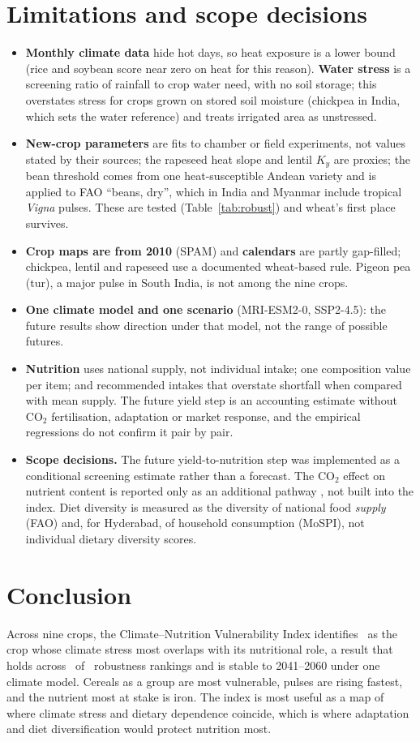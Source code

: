 \section{Limitations and scope decisions}\label{sec:limits}
\begin{itemize}
\item \textbf{Monthly climate data} hide hot days, so heat exposure is a lower bound (rice and soybean
score near zero on heat for this reason). \textbf{Water stress} is a screening ratio of rainfall to crop water
need, with no soil storage; this overstates stress for crops grown on stored soil moisture (chickpea in
India, which sets the water reference) and treats irrigated area as unstressed.
\item \textbf{New-crop parameters} are fits to chamber or field experiments, not values stated by their
sources; the rapeseed heat slope and lentil $K_y$ are proxies; the bean threshold comes from one
heat-susceptible Andean variety and is applied to FAO ``beans, dry'', which in India and Myanmar include
tropical \emph{Vigna} pulses. These are tested (Table~\ref{tab:robust}) and wheat's first place survives.
\item \textbf{Crop maps are from 2010} (SPAM) and \textbf{calendars} are partly gap-filled; chickpea, lentil
and rapeseed use a documented wheat-based rule. Pigeon pea (tur), a major pulse in South India, is not
among the nine crops.
\item \textbf{One climate model and one scenario} (MRI-ESM2-0, SSP2-4.5): the future results show
direction under that model, not the range of possible futures.
\item \textbf{Nutrition} uses national supply, not individual intake; one composition value per item; and
recommended intakes that overstate shortfall when compared with mean supply. The future yield step is an
accounting estimate without CO$_2$ fertilisation, adaptation or market response, and the empirical
regressions do not confirm it pair by pair.
\item \textbf{Scope decisions.} The future yield-to-nutrition step was implemented as a conditional
screening estimate rather than a forecast. The CO$_2$ effect on nutrient content is reported only as an
additional pathway \citep{myers2014}, not built into the index. Diet diversity is measured as the diversity
of national food \emph{supply} (FAO) and, for Hyderabad, of household consumption (MoSPI), not individual
dietary diversity scores.
\end{itemize}

\section{Conclusion}
Across nine crops, the Climate--Nutrition Vulnerability Index identifies \topEq\ as the crop whose climate
stress most overlaps with its nutritional role, a result that holds across \robTopFfour\ of \robNFfour\
robustness rankings and is stable to 2041--2060 under one climate model. Cereals as a group are most
vulnerable, pulses are rising fastest, and the nutrient most at stake is iron. The index is most useful as a
map of where climate stress and dietary dependence coincide, which is where adaptation and diet
diversification would protect nutrition most.
